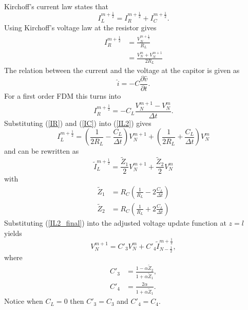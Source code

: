 \documentclass[dutch, a4paper, 11pt]{article}
\begin{document}
\begin{multicols}{2}
\begin{itemize}
    Kirchoff's current law states that
    \begin{equation}
        I^{m+\frac{1}{2}}_{L} = I^{m+\frac{1}{2}}_{R} + I^{m+\frac{1}{2}}_{C}.
        \label{IL2}
    \end{equation}
    Using Kirchoff's voltage law at the resistor gives
    \begin{align}
        I^{m+\frac{1}{2}}_{R} & = \frac{V^{m+\frac{1}{2}}_{N}}{R_{L}}\\
        & = \frac{V^{m}_{N}+V^{m+1}_{N}}{2R_{L}}
        \label{IR}
    \end{align}
    The relation between the current and the voltage at the capitor is given as
    \begin{equation}
        \hat{i} = -C\frac{\partial \hat{v}}{\partial t}.
    \end{equation}
    For a first order FDM this turns into
    \begin{equation}
        I^{m+\frac{1}{2}}_{R} = -C_{L}\frac{V^{m+1}_{N} - V^{m}_{N}}{\Delta t}.
        \label{IC}
    \end{equation}
    Substituting (\ref{IR}) and (\ref{IC}) into (\ref{IL2}) gives
    \begin{equation}
        I^{m+\frac{1}{2}}_{L} = \left(\frac{1}{2R_{L}}-\frac{C_{L}}{\Delta t}\right)V^{m+1}_N + \left(\frac{1}{2R_{L}}+\frac{C_{L}}{\Delta t}\right)V^{m}_N
    \end{equation}
    and can be rewritten as
    \begin{equation}
        \tilde{I}^{m+\frac{1}{2}}_{L} = \frac{\tilde{Z}_{1}}{2}V^{m+1}_N + \frac{\tilde{Z}_{2}}{2}V^{m}_N
        \label{IL2_final}
    \end{equation}
    with
    \begin{align}
        \tilde{Z}_{1} &= R_{C}\left(\frac{1}{R_{L}}-2\frac{C_{L}}{\Delta t}\right)\\
        \tilde{Z}_{2} &= R_{C}\left(\frac{1}{R_{L}}+2\frac{C_{L}}{\Delta t}\right)
    \end{align}
    Substituting (\ref{IL2_final}) into the adjusted voltage update function at $z=l$ yields
    \begin{equation}
        V^{m+1}_{N} = C'_{3}V^{m}_N + C'_{4}\tilde{I}^{m+\frac{1}{2}}_{N-\frac{1}{2}},
    \end{equation}
    where
    \begin{align}
        C'_{3} & = \frac{1-\alpha\tilde{Z}_{2}}{1+\alpha\tilde{Z}_{1}},\\
        C'_{4} & = \frac{2\alpha}{1+\alpha\tilde{Z}_{1}}.
    \end{align}
    Notice when $C_{L} = 0$ then $C'_{3} = C_{3}$ and $C'_{4} = C_{4}$.
\end{itemize}

\end{multicols}
\end{document}
